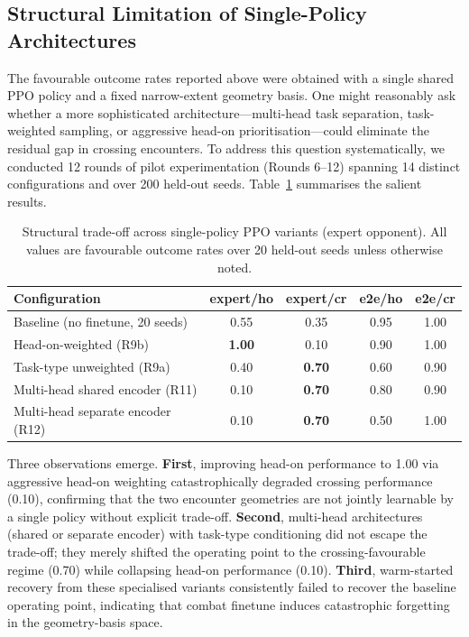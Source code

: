 \documentclass[drones,article,submit,pdftex,moreauthors]{Definitions/mdpi}
\begin{document}
\subsection{Structural Limitation of Single-Policy Architectures}

The favourable outcome rates reported above were obtained with a single shared PPO policy and a fixed narrow-extent geometry basis. One might reasonably ask whether a more sophisticated architecture---multi-head task separation, task-weighted sampling, or aggressive head-on prioritisation---could eliminate the residual gap in crossing encounters. To address this question systematically, we conducted 12 rounds of pilot experimentation (Rounds 6--12) spanning 14 distinct configurations and over 200 held-out seeds. Table~\ref{tab:single_policy_tradeoff} summarises the salient results.

\begin{table}[H]
\centering
\caption{Structural trade-off across single-policy PPO variants (expert opponent). All values are favourable outcome rates over 20 held-out seeds unless otherwise noted.}
\label{tab:single_policy_tradeoff}
\begin{tabular}{@{}lcccc@{}}
\toprule
Configuration & expert/ho & expert/cr & e2e/ho & e2e/cr \\
\midrule
Baseline (no finetune, 20 seeds) & 0.55 & 0.35 & 0.95 & 1.00 \\
Head-on-weighted (R9b) & \textbf{1.00} & 0.10 & 0.90 & 1.00 \\
Task-type unweighted (R9a) & 0.40 & \textbf{0.70} & 0.60 & 0.90 \\
Multi-head shared encoder (R11) & 0.10 & \textbf{0.70} & 0.80 & 0.90 \\
Multi-head separate encoder (R12) & 0.10 & \textbf{0.70} & 0.50 & 1.00 \\
\bottomrule
\end{tabular}
\end{table}

Three observations emerge. \textbf{First}, improving head-on performance to 1.00 via aggressive head-on weighting catastrophically degraded crossing performance (0.10), confirming that the two encounter geometries are not jointly learnable by a single policy without explicit trade-off. \textbf{Second}, multi-head architectures (shared or separate encoder) with task-type conditioning did not escape the trade-off; they merely shifted the operating point to the crossing-favourable regime (0.70) while collapsing head-on performance (0.10). \textbf{Third}, warm-started recovery from these specialised variants consistently failed to recover the baseline operating point, indicating that combat finetune induces catastrophic forgetting in the geometry-basis space.
\end{document}

